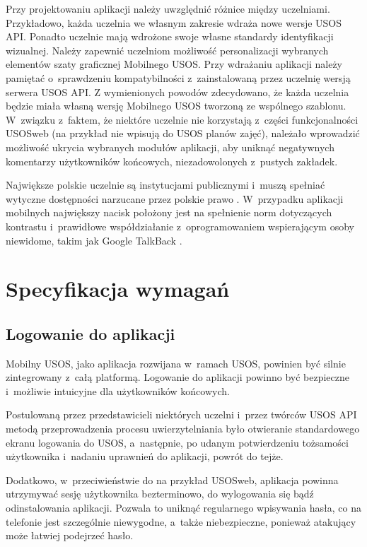\documentclass{pracamgr}
\begin{document}
Przy projektowaniu aplikacji należy uwzględnić różnice między uczelniami.
Przykładowo, każda uczelnia we własnym zakresie wdraża nowe wersje USOS API.
Ponadto uczelnie mają wdrożone swoje własne standardy identyfikacji wizualnej.
Należy zapewnić uczelniom możliwość personalizacji wybranych elementów szaty
graficznej Mobilnego USOS. Przy wdrażaniu aplikacji należy pamiętać o~sprawdzeniu kompatybilności z~zainstalowaną przez uczelnię wersją serwera USOS API.
Z wymienionych powodów zdecydowano, że każda uczelnia będzie miała własną
wersję Mobilnego USOS tworzoną ze wspólnego szablonu. W~związku z~faktem, że
niektóre uczelnie nie korzystają z~części funkcjonalności USOSweb (na przykład nie
wpisują do USOS planów zajęć), należało wprowadzić możliwość ukrycia wybranych modułów aplikacji,
aby uniknąć negatywnych komentarzy użytkowników końcowych, niezadowolonych z~pustych zakładek.

Największe polskie uczelnie są instytucjami publicznymi i~muszą spełniać wytyczne
dostępności narzucane przez polskie prawo \cite{uodc}. W~przypadku aplikacji mobilnych
największy nacisk położony jest na spełnienie norm dotyczących kontrastu i~prawidłowe
współdziałanie z~oprogramowaniem wspierającym osoby niewidome, takim jak Google
TalkBack \cite{talkback}.

\chapter{Specyfikacja wymagań}

\section{Logowanie do aplikacji}

Mobilny USOS, jako aplikacja rozwijana w~ramach USOS, powinien być silnie 
zintegrowany z~całą platformą. Logowanie do aplikacji powinno być bezpieczne i~możliwie
intuicyjne dla użytkowników końcowych.

Postulowaną przez przedstawicieli niektórych uczelni i~przez twórców USOS API
metodą przeprowadzenia procesu uwierzytelniania było otwieranie standardowego ekranu
logowania do USOS, a~następnie, po udanym potwierdzeniu tożsamości użytkownika
i~nadaniu uprawnień do aplikacji, powrót do tejże.

Dodatkowo, w~przeciwieństwie do na przykład USOSweb, aplikacja powinna utrzymywać
sesję użytkownika bezterminowo, do wylogowania się bądź odinstalowania aplikacji.
Pozwala to uniknąć regularnego wpisywania hasła, co na telefonie jest szczególnie
niewygodne, a~także niebezpieczne, ponieważ atakujący może łatwiej podejrzeć hasło.
\end{document}
